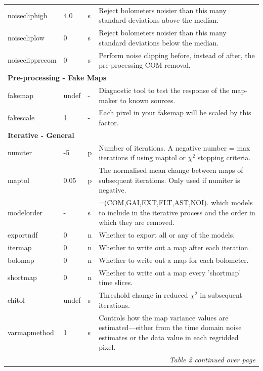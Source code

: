 \documentclass[twoside,11pt]{article}
\newenvironment{latexonly}{}{}
\renewcommand{\_}{\texttt{\symbol{95}}}
\begin{document}
\begin{latexonly}
\begin{table}
\begin{center}
\begin{footnotesize}
\begin{tabular}{|p{2.1cm}|p{0.8cm}|p{0.2cm}|p{11.2cm}|}
 noisecliphigh & 4.0 &s &Reject bolometers noisier than this many standard deviations above the median.\\
 noisecliplow & 0 &s& Reject bolometers noisier than this many standard deviations below the median.\\
 noiseclipprecom & 0 &s &Perform noise clipping before, instead of after, the pre-processing COM removal.\\
\hline
\multicolumn{4}{|l|}{\textbf{Pre-processing - Fake Maps}}\\
\hline
fakemap & undef&- &Diagnostic tool to test the response of the map-maker to known sources.  \\
fakescale & 1 &- &Each pixel in your fakemap will be scaled by this factor. \\


\hline
\multicolumn{4}{|l|}{\textbf{Iterative - General}}\\
\hline
numiter & -5 &p& Number of iterations. A negative number = max iterations if using maptol or $\chi^2$ stopping criteria.\\
maptol & 0.05 &p &The normalised mean change between maps of subsequent iterations. Only used if numiter is negative.\\
modelorder & - &s& =(COM,GAI,EXT,FLT,AST,NOI). which models to include in the iterative process and the order in which they are removed. \\
exportndf & 0 &n& Whether to export all or any of the models. \\
itermap & 0 &n& Whether to write out a map after each iteration.\\
bolomap & 0 &n& Whether to write out a map for each bolometer.\\
shortmap & 0 &n& Whether to write out a map every 'shortmap' time slices.\\
chitol & undef &s& Threshold change in reduced $\chi^2$ in subsequent iterations.\\
varmapmethod & 1 &s& Controls how the map variance values are estimated---either from the time domain noise estimates or the data value in each regridded pixel.\\

\hline
 \multicolumn{4}{|r|}{\emph{Table 2 continued over page}}\\
\hline
\end{tabular}
\label{tab:dimmdef}
\end{footnotesize}
\end{center}
\end{table}



\end{latexonly}
\end{document}
